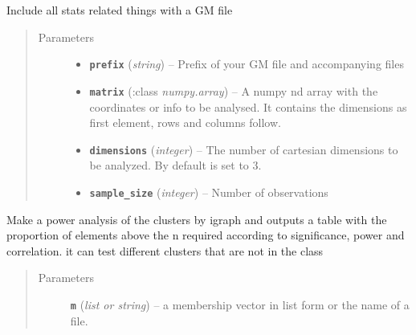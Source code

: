 \documentclass[letterpaper,10pt,english]{sphinxmanual}
\begin{document}
\begin{fulllineitems}
\label{Doc:Moduler.GMstats}
Include all stats related things with a GM file
\begin{quote}\begin{description}
\item[{Parameters}] \leavevmode\begin{itemize}
\item {} 
\textbf{\texttt{prefix}} (\emph{string}) -- Prefix of your GM file and accompanying files

\item {} 
\textbf{\texttt{matrix}} (:class \emph{numpy.array}) -- A numpy nd array with the coordinates or info to be analysed. It contains the dimensions as first element, rows and columns follow.

\item {} 
\textbf{\texttt{dimensions}} (\emph{integer}) -- The number of cartesian dimensions to be analyzed. By default is set to 3.

\item {} 
\textbf{\texttt{sample\_size}} (\emph{integer}) -- Number of observations

\end{itemize}

\end{description}\end{quote}

\begin{fulllineitems}
\label{Doc:Moduler.GMstats.Clus_Power}
Make a power analysis of the clusters by igraph and outputs a table with the proportion 
of elements above the n required according to significance, power and correlation.
it can test different clusters that are not in the class
\begin{quote}\begin{description}
\item[{Parameters}] \leavevmode
\textbf{\texttt{m}} (\emph{list or string}) -- a membership vector in list form or the name of a file.

\end{description}\end{quote}

\end{fulllineitems}


\end{fulllineitems}
\end{document}
